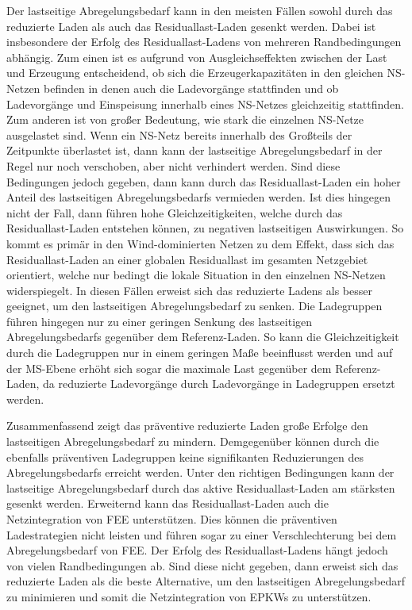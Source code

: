 Der lastseitige Abregelungsbedarf kann in den meisten Fällen sowohl durch das reduzierte Laden als auch das Residuallast-Laden gesenkt werden.
Dabei ist insbesondere der Erfolg des Residuallast-Ladens von mehreren Randbedingungen abhängig.
Zum einen ist es aufgrund von Ausgleichseffekten zwischen der Last und Erzeugung entscheidend, ob sich die Erzeugerkapazitäten in den gleichen \gls{NS}-Netzen befinden in denen auch die Ladevorgänge stattfinden und ob Ladevorgänge und Einspeisung innerhalb eines \gls{NS}-Netzes gleichzeitig stattfinden.
Zum anderen ist von großer Bedeutung, wie stark die einzelnen \gls{NS}-Netze ausgelastet sind.
Wenn ein \gls{NS}-Netz bereits innerhalb des Großteils der Zeitpunkte überlastet ist, dann kann der lastseitige Abregelungsbedarf in der Regel nur noch verschoben, aber nicht verhindert werden.
Sind diese Bedingungen jedoch gegeben, dann kann durch das Residuallast-Laden ein hoher Anteil des lastseitigen Abregelungsbedarfs vermieden werden.
Ist dies hingegen nicht der Fall, dann führen hohe Gleichzeitigkeiten, welche durch das Residuallast-Laden entstehen können, zu negativen lastseitigen Auswirkungen.
So kommt es primär in den Wind-dominierten Netzen zu dem Effekt, dass sich das Residuallast-Laden an einer globalen Residuallast im gesamten Netzgebiet orientiert, welche nur bedingt die lokale Situation in den einzelnen \gls{NS}-Netzen widerspiegelt.
In diesen Fällen erweist sich das reduzierte Ladens als besser geeignet, um den lastseitigen Abregelungsbedarf zu senken.
Die Ladegruppen führen hingegen nur zu einer geringen Senkung des lastseitigen Abregelungsbedarfs gegenüber dem Referenz-Laden.
So kann die Gleichzeitigkeit durch die Ladegruppen nur in einem geringen Maße beeinflusst werden und auf der \gls{MS}-Ebene erhöht sich sogar die maximale Last gegenüber dem Referenz-Laden, da reduzierte Ladevorgänge durch Ladevorgänge in Ladegruppen ersetzt werden.\medskip

Zusammenfassend zeigt das präventive reduzierte Laden große Erfolge den lastseitigen Abregelungsbedarf zu mindern.
Demgegenüber können durch die ebenfalls präventiven Ladegruppen keine signifikanten Reduzierungen des Abregelungsbedarfs erreicht werden.
Unter den richtigen Bedingungen kann der lastseitige Abregelungsbedarf durch das aktive Residuallast-Laden am stärksten gesenkt werden.
Erweiternd kann das Residuallast-Laden auch die Netzintegration von \gls{FEE} unterstützen.
Dies können die präventiven Ladestrategien nicht leisten und führen sogar zu einer Verschlechterung bei dem Abregelungsbedarf von \gls{FEE}.
Der Erfolg des Residuallast-Ladens hängt jedoch von vielen Randbedingungen ab.
Sind diese nicht gegeben, dann erweist sich das reduzierte Laden als die beste Alternative, um den lastseitigen Abregelungsbedarf zu minimieren und somit die Netzintegration von \glspl{EPKW} zu unterstützen.\medskip

